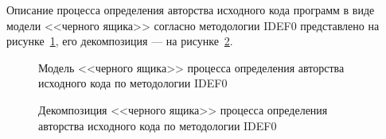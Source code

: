 Описание процесса определения авторства исходного кода программ в виде модели <<черного ящика>> согласно методологии IDEF0 представлено на рисунке~\ref{box_1:box_1}, его декомпозиция --- на рисунке~\ref{box_2:box_2}.

\begin{figure}[h!]
\caption{ Модель <<черного ящика>> процесса определения авторства исходного кода по методологии IDEF0 }
\label{box_1:box_1}
\end{figure} 

\begin{figure}[h!]
\caption{ Декомпозиция <<черного ящика>> процесса определения авторства исходного кода по методологии IDEF0 }
\label{box_2:box_2}
\end{figure} 
